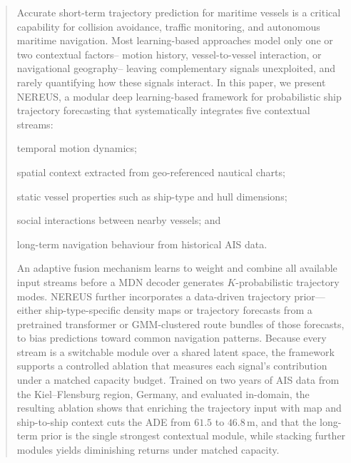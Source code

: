 \documentclass[runningheads]{preamp/llncs}
\begin{document}
\begin{abstract}
Accurate short-term trajectory prediction for maritime vessels
is a critical capability for
collision avoidance,
traffic monitoring,
and
autonomous maritime navigation.
Most learning-based approaches
model only one or two contextual factors--%
motion history,
vessel-to-vessel interaction,
or navigational geography--%
leaving
complementary signals unexploited,
and
rarely quantifying how these signals interact.
In this paper, we present \acs{NEREUS},
a modular deep learning-based framework
for
probabilistic ship trajectory forecasting
that
systematically integrates five contextual streams:
\begin{enumerate*}[label=(\roman*)]
    \item temporal motion dynamics;
    \item spatial context extracted from geo-referenced nautical charts;
    \item static vessel properties such as ship-type and hull dimensions;
    \item social interactions between nearby vessels; and
    \item long-term navigation behaviour from historical \acs{AIS} data.
\end{enumerate*}
%
An adaptive fusion mechanism
learns to
weight and combine
all available input streams
before a \acs{MDN} decoder generates $K$-probabilistic trajectory modes.
%
\acs{NEREUS}
further incorporates a data-driven trajectory prior---%
either
ship-type-specific density maps
or
trajectory forecasts from a pretrained transformer
or
\acs{GMM}-clustered route bundles of those forecasts,
to
bias predictions toward common navigation patterns.
%
Because every stream is a switchable module over a shared latent space,
the framework supports a controlled ablation
that measures each signal's contribution under a matched capacity budget.
%
Trained on two years of \acs{AIS} data from the Kiel--Flensburg region, Germany,
and
evaluated in-domain,
the resulting ablation shows that enriching the trajectory input
with map and ship-to-ship context cuts the \acs{ADE} from $61.5$ to $46.8$\,m,
and
that the long-term prior is the single strongest contextual module,
while
stacking further modules yields diminishing returns under matched capacity.
%
%


\end{abstract}
\end{document}
